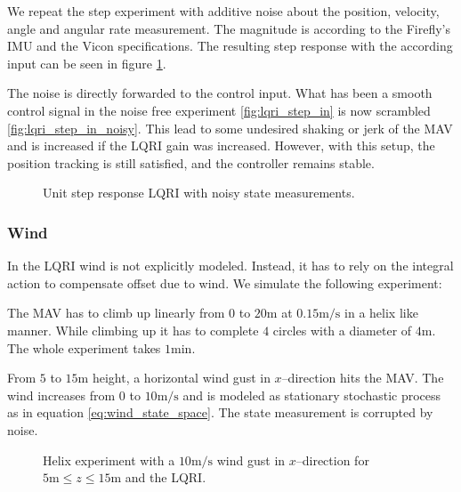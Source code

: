 We repeat the step experiment with additive noise about the position, velocity, angle and angular rate measurement. The magnitude is according to the Firefly's IMU and the Vicon specifications. The resulting step response with the according input can be seen in figure \ref{fig:lqri_step_noisy}.

The noise is directly forwarded to the control input. What has been a smooth control signal in the noise free experiment \ref{fig:lqri_step_in} is now scrambled \ref{fig:lqri_step_in_noisy}. This lead to some undesired shaking or jerk of the MAV and is increased if the LQRI gain was increased. However, with this setup, the position tracking is still satisfied, and the controller remains stable.

\begin{figure}
\centering
{}
\qquad
{}
\caption{Unit step response LQRI with noisy state measurements.}
\label{fig:lqri_step_noisy}
\end{figure}

\subsubsection{Wind}
In the LQRI wind is not explicitly modeled. Instead, it has to rely on the integral action to compensate offset due to wind. We simulate the following experiment:

The MAV has to climb up linearly from $0$ to $20 \si{\metre}$ at $0.15 \si{\metre\per\second}$ in a helix like manner. While climbing up it has to complete $4$ circles with a diameter of $4\si{\metre}$. The whole experiment takes $1 \si{\minute}$. 

From $5$ to $15 \si{\metre}$ height, a horizontal wind gust in $x$--direction hits the MAV. The wind increases from $0$ to $10 \si{\metre\per\second}$ and is modeled as stationary stochastic process as in equation \ref{eq:wind_state_space}. The state measurement is corrupted by noise.

\begin{figure}
\centering
{}
\qquad
{}
\caption{Helix experiment with a $10 \si{\metre\per\second}$ wind gust in $x$--direction for $5 \si{\metre} \leq z \leq 15 \si{\metre}$ and the LQRI.}
\label{fig:lqri_helix}
\end{figure}


